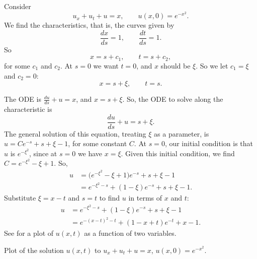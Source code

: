 \begin{example}
Consider
\begin{equation*}
u_x + u_t + u = x, \qquad u(x,0) = e^{-x^2} .
\end{equation*}
We find the characteristics, that is, the curves given by
\begin{equation*}
\frac{dx}{ds} = 1, \qquad \frac{dt}{ds} = 1 .
\end{equation*}
So
\begin{equation*}
x = s + c_1, \qquad t = s+ c_2 ,
\end{equation*}
for some $c_1$ and $c_2$.
At $s=0$ we want $t=0$, and $x$ should be $\xi$.  So
we let $c_1 = \xi$ and $c_2 = 0$:
\begin{equation*}
x = s + \xi, \qquad t = s .
\end{equation*}

The ODE is $\frac{du}{ds} + u = x$, and $x = s+\xi$. So, the ODE
to solve along the characteristic is
\begin{equation*}
\frac{du}{ds} + u = s+ \xi .
\end{equation*}
The general solution of this equation, treating $\xi$ as a parameter, is 
$u = C e^{-s}+s+\xi-1$, for some constant $C$.
At $s=0$, our initial condition is that $u$ is
$e^{-\xi^2}$, since at $s=0$ we have $x=\xi$.
Given this initial condition, we find $C=e^{-\xi^2} - \xi +1$.  So,
\begin{equation*}
\begin{split}
u & =
\bigl(e^{-\xi^2} - \xi +1\bigr) e^{-s}+s+\xi-1
\\
& =
e^{-\xi^2-s} + (1 - \xi) e^{-s} +s+\xi-1 .
\end{split}
\end{equation*}
Substitute $\xi = x-t$ and $s=t$ to find $u$ in terms of $x$ and $t$:
\begin{equation*}
\begin{split}
u
& =
e^{-\xi^2-s} + (1 - \xi) e^{-s} +s+\xi-1 
\\
& =
e^{-{(x-t)}^2-t} + (1 - x + t) e^{-t} +x-1 .
\end{split}
\end{equation*}
See  for a plot of $u(x,t)$ as a function of
two variables.
\begin{myfig}
\capstart
{}
\caption{Plot of the solution $u(x,t)$ to
$u_x + u_t + u = x$,  $u(x,0) = e^{-x^2}$.\label{fopde:surfaceplot}}
\end{myfig}
\end{example}

